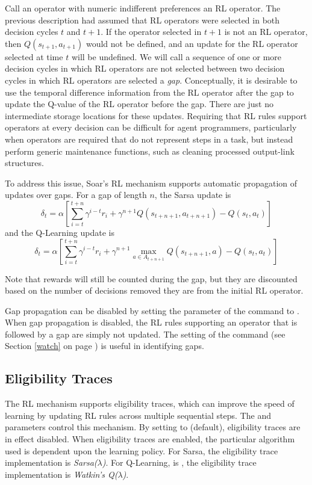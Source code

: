 Call an operator with numeric indifferent preferences an RL operator.
The previous description had assumed that RL operators were selected in both decision cycles $t$ and $t+1$.
If the operator selected in $t+1$ is not an RL operator, then $Q(s_{t+1}, a_{t+1})$ would not be defined, and an update for the RL operator selected at time $t$ will be undefined.
We will call a sequence of one or more decision cycles in which RL operators are not selected between two decision cycles in which RL operators are selected a \emph{gap}.
Conceptually, it is desirable to use the temporal difference information from the RL operator after the gap to update the Q-value of the RL operator before the gap.
There are just no intermediate storage locations for these updates.
Requiring that RL rules support operators at every decision can be difficult for agent programmers, particularly when operators are required that do not represent steps in a task, but instead perform generic maintenance functions, such as cleaning processed output-link structures.

To address this issue, Soar's RL mechanism supports automatic propagation of updates over gaps.
For a gap of length $n$, the Sarsa update is
$$\delta_t = \alpha \left[ \sum_{i=t}^{t+n}{\gamma^{i-t} r_i} + \gamma^{n+1} Q(s_{t+n+1}, a_{t+n+1}) - Q(s_t, a_t) \right]$$
and the Q-Learning update is
$$\delta_t = \alpha \left[ \sum_{i=t}^{t+n}{\gamma^{i-t} r_i} + \gamma^{n+1} \underset{a \in A_{t+n+1}}{\max} Q(s_{t+n+1}, a) - Q(s_t, a_t) \right]$$

Note that rewards will still be counted during the gap, but they are discounted based on the number of decisions removed they are from the initial RL operator.

Gap propagation can be disabled by setting the  parameter of the  command to .
When gap propagation is disabled, the RL rules supporting an operator that is followed by a gap are simply not updated.
The  setting of the  command (see Section \ref{watch} on page \pageref{watch}) is useful in identifying gaps.

\subsection{Eligibility Traces}
\label{RL-et}
The RL mechanism supports eligibility traces, which can improve the speed of learning by updating RL rules across multiple sequential steps.
The  and  parameters control this mechanism.
By setting  to  (default), eligibility traces are in effect disabled.
When eligibility traces are enabled, the particular algorithm used is dependent upon the learning policy.
For Sarsa, the eligibility trace implementation is \emph{Sarsa($\lambda$)}. 
For Q-Learning, is , the eligibility trace implementation is \emph{Watkin's Q($\lambda$)}.

